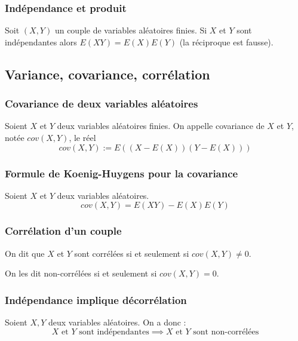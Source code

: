         \subsubsection{Indépendance et produit}
            Soit $(X, Y)$ un couple de variables aléatoires finies. Si $X$ et $Y$ sont indépendantes
            alors $E(XY) = E(X)E(Y)$ (la réciproque est fausse).

    \subsection{Variance, covariance, corrélation}

        \subsubsection{Covariance de deux variables aléatoires}
            Soient $X$ et $Y$ deux variables aléatoires finies. On appelle covariance de $X$ et $Y$,
            notée $cov(X, Y)$, le réel
            \[
                cov(X, Y) := E((X - E(X))(Y - E(X)))
            \]

        \subsubsection{Formule de Koenig-Huygens pour la covariance}
            Soient $X$ et $Y$ deux variables aléatoires.
            \[
                cov(X, Y) = E(XY) - E(X)E(Y)
            \]

        \subsubsection{Corrélation d'un couple}
            On dit que $X$ et $Y$ sont corrélées si et seulement si $cov(X, Y) \neq 0$.

            On les dit non-corrélées si et seulement si $cov(X, Y) = 0$.

        \subsubsection{Indépendance implique décorrélation}
            Soient $X, Y$ deux variables aléatoires. On a donc :
            \[
                X \text{ et } Y \text{ sont indépendantes} \implies X \text{ et } Y \text{ sont non-corrélées}
            \]
        
